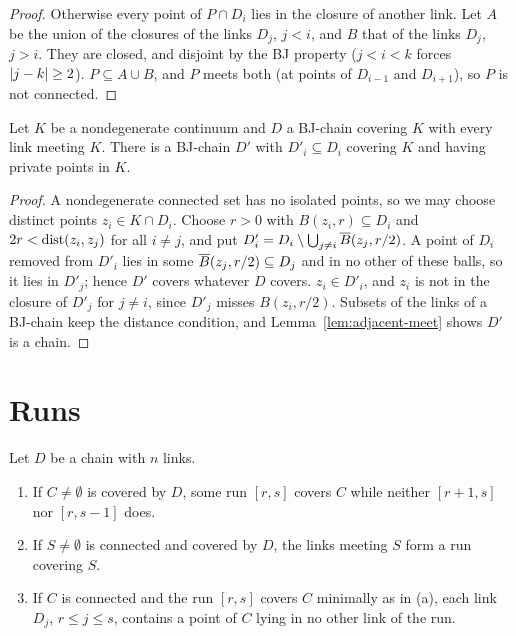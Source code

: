 \begin{proof}
Otherwise every point of $P\cap D_i$ lies in the closure of another link. Let $A$ be the union of the closures of the links $D_j$, $j<i$, and $B$ that of
the links $D_j$, $j>i$. They are closed, and disjoint by the BJ property ($j<i<k$ forces $\left\lvert j-k\right\rvert\ge2$). $P\subseteq A\cup B$, and $P$ meets both (at
points of $D_{i-1}$ and $D_{i+1}$), so $P$ is not connected.
\end{proof}


\begin{proposition}\label{prop:private-shrink}
Let $K$ be a nondegenerate continuum and $D$ a BJ-chain covering $K$ with every link meeting $K$. There is a BJ-chain $D'$ with $D'_i\subseteq D_i$ covering
$K$ and having private points in $K$.
\end{proposition}

\begin{proof}
A nondegenerate connected set has no isolated points, so we may choose distinct points $z_i\in K\cap D_i$. Choose $r>0$ with $B(z_i,r)\subseteq D_i$ and
$2r<\operatorname{dist}(z_i,z_j)$ for all $i\neq j$, and put $D'_i=D_i\setminus\bigcup_{j\ne i}\overline{B}(z_j,r/2)$. A point of $D_i$ removed from $D'_i$ lies in some
$\overline{B}(z_j,r/2)\subseteq D_j$ and in no other of these balls, so it lies in $D'_j$; hence $D'$ covers whatever $D$ covers. $z_i\in D'_i$, and $z_i$ is not in
the closure of $D'_j$ for $j\neq i$, since $D'_j$ misses $B(z_i,r/2)$. Subsets of the links of a BJ-chain keep the distance condition, and
Lemma~\ref{lem:adjacent-meet} shows $D'$ is a chain.
\end{proof}


\section{Runs}

\begin{lemma}\label{lem:runs}
Let $D$ be a chain with $n$ links.
\begin{enumerate}[label=(\alph*)]
\item If $C\neq\emptyset$ is covered by $D$, some run $[r,s]$ covers $C$ while neither $[r+1,s]$ nor $[r,s-1]$ does.
\item If $S\neq\emptyset$ is connected and covered by $D$, the links meeting $S$ form a run covering $S$.
\item If $C$ is connected and the run $[r,s]$ covers $C$ minimally as in (a), each link $D_j$, $r\le j\le s$, contains a point of $C$ lying in no other
link of the run.
\end{enumerate}
\end{lemma}

